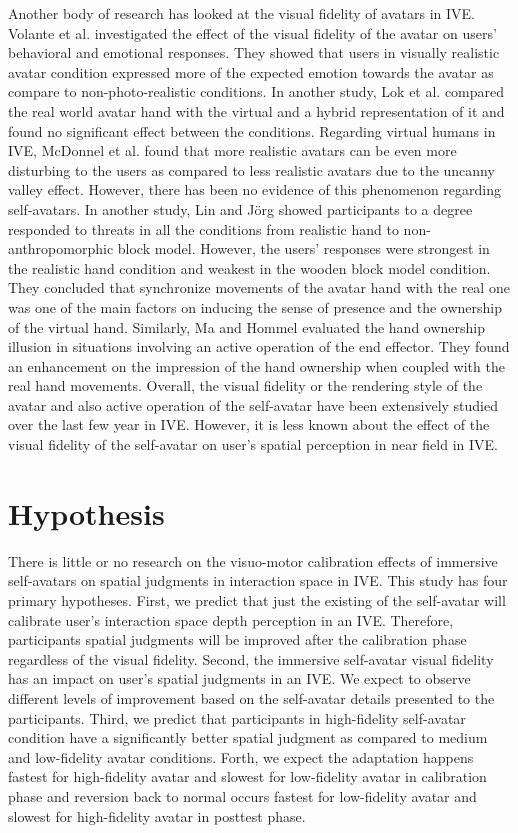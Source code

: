 Another body of research has looked at the visual fidelity of avatars in IVE. Volante et al. \cite{VBC+16} investigated the effect of the visual fidelity of the avatar on users' behavioral and emotional responses. They showed that users in visually realistic avatar condition expressed more of the expected emotion towards the avatar as compare to non-photo-realistic conditions. In another study, Lok et al. \cite{LNW+03} compared the real world avatar hand with the virtual and a hybrid representation of it and found no significant effect between the conditions. Regarding virtual humans in IVE, McDonnel et al. \cite{MBB12} found that more realistic avatars can be even more disturbing to the users as compared to less realistic avatars due to the uncanny valley effect. However, there has been no evidence of this phenomenon regarding self-avatars. In another study, Lin and J{\"o}rg \cite{LJ16} showed participants to a degree responded to threats in all the conditions from realistic hand to non-anthropomorphic block model. However, the users' responses were strongest in the realistic hand condition and weakest in the wooden block model condition. They concluded that synchronize movements of the avatar hand with the real one was one of the main factors on inducing the sense of presence and the ownership of the virtual hand. Similarly, Ma and Hommel \cite{MH15} evaluated the hand ownership illusion in situations involving an active operation of the end effector. They found an enhancement on the impression of the hand ownership when coupled with the real hand movements. Overall, the visual fidelity or the rendering style of the avatar and also active operation of the self-avatar have been extensively studied over the last few year in IVE. However, it is less known about the effect of the visual fidelity of the self-avatar on user's spatial perception in near field in IVE.

\section{Hypothesis}

There is little or no research on the visuo-motor calibration effects of immersive self-avatars on spatial judgments in interaction space in IVE. This study has four primary hypotheses. First, we predict that just the existing of the self-avatar will calibrate user's interaction space depth perception in an IVE. Therefore, participants spatial judgments will be improved after the calibration phase regardless of the visual fidelity. Second, the immersive self-avatar visual fidelity has an impact on user's spatial judgments in an IVE. We expect to observe different levels of improvement based on the self-avatar details presented to the participants. Third, we predict that participants in high-fidelity self-avatar condition have a significantly better spatial judgment as compared to medium and low-fidelity avatar conditions. Forth, we expect the adaptation happens fastest for high-fidelity avatar and slowest for low-fidelity avatar in calibration phase and reversion back to normal occurs fastest for low-fidelity avatar and slowest for high-fidelity avatar in posttest phase.


